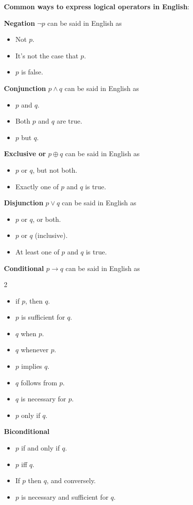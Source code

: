 
{\bf Common ways to express logical operators in English}:

{\bf Negation} $\lnot p$ can be said in English as 

\vspace{-20pt}
\begin{itemize}
\item Not $p$.
\item It's not the case that $p$.
\item $p$ is false.
\end{itemize}

{\bf Conjunction} $p \land q$ can be said in English as

\vspace{-20pt}
\begin{itemize}
    \item $p$ and $q$.
    \item Both $p$ and $q$ are true.
    \item $p$ but $q$.
\end{itemize}

{\bf Exclusive or} $p \oplus q$ can be said in English as

\vspace{-20pt}
\begin{itemize}
    \item $p$ or $q$, but not both.
    \item Exactly one of $p$ and $q$ is true.
\end{itemize}

{\bf Disjunction} $p \lor q$ can be said in English as

\vspace{-20pt}
\begin{itemize}
    \item $p$ or $q$, or both.
    \item $p$ or $q$ (inclusive).
    \item At least one of $p$ and $q$ is true.
\end{itemize}

{\bf Conditional} $p \to q$ can be said in English as

\begin{multicols}{2}
\begin{itemize}
    \item if $p$, then $q$.
    \item $p$ is sufficient for $q$.
    \item $q$ when $p$.
    \item $q$ whenever $p$.
    \item $p$ implies $q$.
    \item $q$ follows from $p$.
    \item $q$ is necessary for $p$.
    \item $p$ only if $q$.
\end{itemize}
\end{multicols}

{\bf Biconditional}

\vspace{-20pt}
\begin{itemize}
    \item $p$ if and only if $q$.
    \item $p$ iff $q$.
    \item If $p$ then $q$, and conversely.
    \item $p$ is necessary and sufficient for $q$.
\end{itemize}